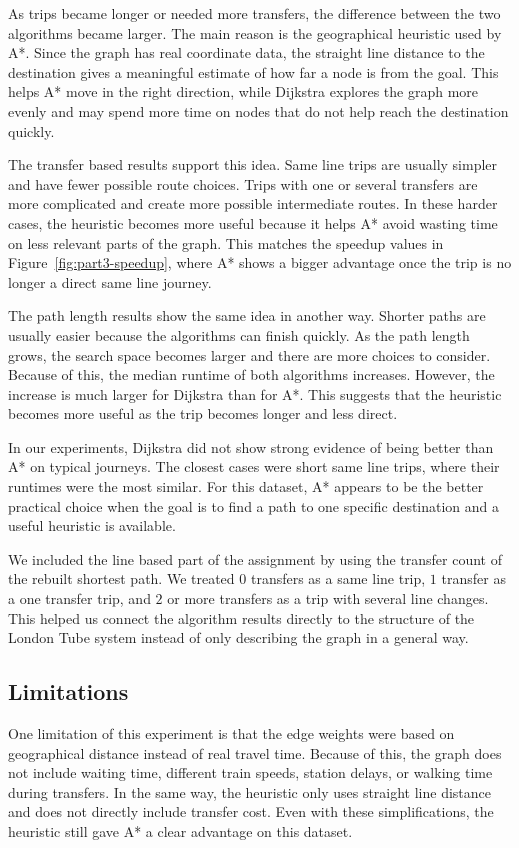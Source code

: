 \documentclass[letterpaper]{article}
\theoremstyle{plain}
\theoremstyle{definition}
\theoremstyle{remark}
\newcounter{experiment}
\begin{document}
As trips became longer or needed more transfers, the difference between the two algorithms became larger. The 
main reason is the geographical heuristic used by A*. Since the graph has real coordinate data, the straight line 
distance to the destination gives a meaningful estimate of how far a node is from the goal. This helps A* move 
in the right direction, while Dijkstra explores the graph more evenly and may spend more time on nodes that do 
not help reach the destination quickly.

The transfer based results support this idea. Same line trips are usually simpler and have fewer possible route 
choices. Trips with one or several transfers are more complicated and create more possible intermediate routes. 
In these harder cases, the heuristic becomes more useful because it helps A* avoid wasting time on less relevant 
parts of the graph. This matches the speedup values in Figure~\ref{fig:part3-speedup}, where A* shows a bigger 
advantage once the trip is no longer a direct same line journey.

The path length results show the same idea in another way. Shorter paths are usually easier because the 
algorithms can finish quickly. As the path length grows, the search space becomes larger and there are more 
choices to consider. Because of this, the median runtime of both algorithms increases. However, the increase 
is much larger for Dijkstra than for A*. This suggests that the heuristic becomes more useful as the trip 
becomes longer and less direct.

In our experiments, Dijkstra did not show strong evidence of being better than A* on typical journeys. The 
closest cases were short same line trips, where their runtimes were the most similar. For this dataset, 
A* appears to be the better practical choice when the goal is to find a path to one specific destination and a 
useful heuristic is available.

We included the line based part of the assignment by using the transfer count of the rebuilt shortest path. We 
treated \(0\) transfers as a same line trip, \(1\) transfer as a one transfer trip, and \(2\) or more transfers 
as a trip with several line changes. This helped us connect the algorithm results directly to the structure of 
the London Tube system instead of only describing the graph in a general way.

\subsection*{Limitations}
One limitation of this experiment is that the edge weights were based on geographical distance instead of real 
travel time. Because of this, the graph does not include waiting time, different train speeds, station delays, 
or walking time during transfers. In the same way, the heuristic only uses straight line distance and does not 
directly include transfer cost. Even with these simplifications, the heuristic still gave A* a clear advantage 
on this dataset.
\end{document}
